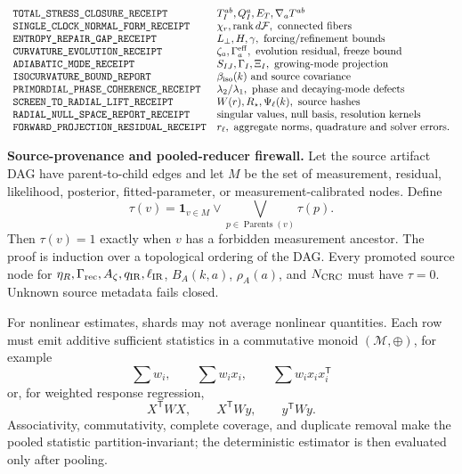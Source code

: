 \[
\begin{array}{ll}
\mbox{\texttt{TOTAL\_STRESS\_CLOSURE\_RECEIPT}} & T_I^{ab},Q_I^a,E_T,\nabla_aT^{ab} \\
\mbox{\texttt{SINGLE\_CLOCK\_NORMAL\_FORM\_RECEIPT}} & \chi_r,\operatorname{rank}d\mathcal F,\hbox{ connected fibers} \\
\mbox{\texttt{ENTROPY\_REPAIR\_GAP\_RECEIPT}} & L_\perp,H,\gamma,\hbox{ forcing/refinement bounds} \\
\mbox{\texttt{CURVATURE\_EVOLUTION\_RECEIPT}} & \zeta_a,\Gamma_a^{\rm eff},\hbox{ evolution residual, freeze bound} \\
\mbox{\texttt{ADIABATIC\_MODE\_RECEIPT}} & S_{IJ},\Gamma_I,\Xi_I,\hbox{ growing-mode projection} \\
\mbox{\texttt{ISOCURVATURE\_BOUND\_REPORT}} & \beta_{\rm iso}(k)\hbox{ and source covariance} \\
\mbox{\texttt{PRIMORDIAL\_PHASE\_COHERENCE\_RECEIPT}} & \lambda_2/\lambda_1,\hbox{ phase and decaying-mode defects} \\
\mbox{\texttt{SCREEN\_TO\_RADIAL\_LIFT\_RECEIPT}} & W(r),R_\star,\Psi_\ell(k),\hbox{ source hashes} \\
\mbox{\texttt{RADIAL\_NULL\_SPACE\_REPORT\_RECEIPT}} & \hbox{singular values, null basis, resolution kernels} \\
\mbox{\texttt{FORWARD\_PROJECTION\_RESIDUAL\_RECEIPT}} & r_\ell,\hbox{ aggregate norms, quadrature and solver errors}.
\end{array}
\]

\textbf{Source-provenance and pooled-reducer firewall.}\label{par:source-provenance-firewall}
Let the source artifact DAG have parent-to-child edges and let \(M\) be the set
of measurement, residual, likelihood, posterior, fitted-parameter, or
measurement-calibrated nodes.  Define
\[
\tau(v)=\mathbf 1_{v\in M}\lor
\bigvee_{p\in\operatorname{Parents}(v)}\tau(p).
\]
Then \(\tau(v)=1\) exactly when \(v\) has a forbidden measurement ancestor.  The
proof is induction over a topological ordering of the DAG.  Every promoted
source node for \(\eta_R,\Gamma_{\rm rec},A_\zeta,q_{\rm IR},\ell_{\rm IR}\),
\(B_A(k,a)\), \(\rho_A(a)\), and \(N_{\rm CRC}\) must have \(\tau=0\).
Unknown source metadata fails closed.

For nonlinear estimates, shards may not average nonlinear quantities.
Each row must emit additive sufficient statistics in a commutative monoid
\((\mathcal M,\oplus)\), for example
\[
\sum w_i,\qquad \sum w_ix_i,\qquad \sum w_ix_ix_i^{\mathsf T}
\]
or, for weighted response regression,
\[
X^{\mathsf T}WX,\qquad X^{\mathsf T}Wy,\qquad y^{\mathsf T}Wy .
\]
Associativity, commutativity, complete coverage, and duplicate removal make the
pooled statistic partition-invariant; the deterministic estimator is then
evaluated only after pooling.

